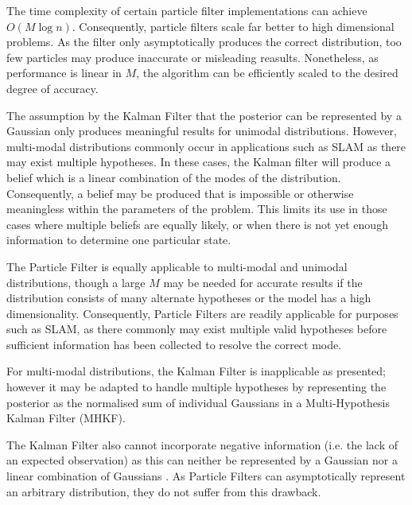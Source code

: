 \documentclass[english]{article}
\begin{document}
The time complexity of certain particle filter implementations can achieve $O(M \log n)$\cite{Thrun02d}. Consequently, particle filters scale far better to high dimensional problems. As the filter only asymptotically produces the correct distribution, too few particles may produce inaccurate or misleading reasults. Nonetheless, as performance is linear in $M$, the algorithm can be efficiently scaled to the desired degree of accuracy.

The assumption by the Kalman Filter that the posterior can be represented by a Gaussian only produces meaningful results for unimodal distributions. However, multi-modal distributions commonly occur in applications such as SLAM as there may exist multiple hypotheses. In these cases, the Kalman filter will produce a belief which is a linear combination of the modes of the distribution. Consequently, a belief may be produced that is impossible or otherwise meaningless within the parameters of the problem. This limits its use in those cases where multiple beliefs are equally likely, or when there is not yet enough information to determine one particular state.

The Particle Filter is equally applicable to multi-modal and unimodal distributions, though a large $M$ may be needed for accurate results if the distribution consists of many alternate hypotheses or the model has a high dimensionality. Consequently, Particle Filters are readily applicable for purposes such as SLAM, as there commonly may exist multiple valid hypotheses before sufficient information has been collected to resolve the correct mode. 

For multi-modal distributions, the Kalman Filter is inapplicable as presented; however it may be adapted to handle multiple hypotheses by representing the posterior as the normalised sum of individual Gaussians in a Multi-Hypothesis Kalman Filter (MHKF)\cite{probrob}.

The Kalman Filter also cannot incorporate negative information (i.e. the lack of an expected observation) as this can neither be represented by a Gaussian nor a linear combination of Gaussians \cite{Thrun02d}. As Particle Filters can asymptotically represent an arbitrary distribution, they do not suffer from this drawback.
\end{document}
